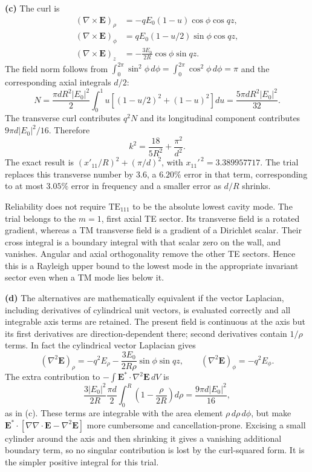 \textbf{(c)} The curl is
\begin{align*}
(\nabla\times\mathbf E)_\rho&=-qE_0(1-u)\cos\phi\cos qz,\\
(\nabla\times\mathbf E)_\phi&=qE_0(1-u/2)\sin\phi\cos qz,\\
(\nabla\times\mathbf E)_z&=-\frac{3E_0}{2R}\cos\phi\sin qz.
\end{align*}
The field norm follows from $\int_0^{2\pi}\sin^2\phi\,d\phi=
\int_0^{2\pi}\cos^2\phi\,d\phi=\pi$ and the corresponding axial
integrals $d/2$:
\[
N=\frac{\pi dR^2|E_0|^2}{2}
\int_0^1u[(1-u/2)^2+(1-u)^2]du
=\frac{5\pi dR^2|E_0|^2}{32}.
\]
The transverse curl contributes $q^2N$ and its longitudinal component
contributes $9\pi d|E_0|^2/16$.  Therefore
\[
\boxed{k^2=\frac{18}{5R^2}+\frac{\pi^2}{d^2}.}
\]
The exact result is $(x'_{11}/R)^2+(\pi/d)^2$, with
$x_{11}'^{\,2}=3.389957717$.  The trial replaces this transverse
number by $3.6$, a $6.20\%$ error in that term, corresponding to at
most $3.05\%$ error in frequency and a smaller error as $d/R$ shrinks.

Reliability does not require $\mathrm{TE}_{111}$ to be the absolute
lowest cavity mode.  The trial belongs to the $m=1$, first axial
TE sector.  Its transverse field is a rotated gradient, whereas a
TM transverse field is a gradient of a Dirichlet scalar.  Their
cross integral is a boundary integral with that scalar zero on the
wall, and vanishes.  Angular and axial orthogonality remove the
other TE sectors.  Hence this is a Rayleigh upper bound to the
lowest mode in the appropriate invariant sector even when a TM
mode lies below it.

\textbf{(d)} The alternatives are mathematically equivalent if the
vector Laplacian, including derivatives of cylindrical unit vectors,
is evaluated correctly and all integrable axis terms are retained.
The present field is continuous at the axis but its first derivatives
are direction-dependent there; second derivatives contain $1/\rho$
terms. In fact the cylindrical vector Laplacian gives
\[
(\nabla^2\mathbf E)_\rho=-q^2E_\rho
-\frac{3E_0}{2R\rho}\sin\phi\sin qz,\qquad
(\nabla^2\mathbf E)_\phi=-q^2E_\phi.
\]
The extra contribution to $-\int\mathbf E^*\cdot\nabla^2\mathbf E\,dV$
is
\[
\frac{3|E_0|^2}{2R}\frac{\pi d}{2}
\int_0^R\left(1-\frac{\rho}{2R}\right)d\rho
=\frac{9\pi d|E_0|^2}{16},
\]
as in (c). These terms are integrable with the area element
$\rho\,d\rho\,d\phi$,
but make $\mathbf E^*\cdot[\nabla\nabla\cdot\mathbf E-\nabla^2\mathbf E]$
more cumbersome and cancellation-prone.  Excising a small cylinder
around the axis and then shrinking it gives a vanishing additional
boundary term, so no singular contribution is lost by the
curl-squared form.  It is the simpler positive integral for this trial.

